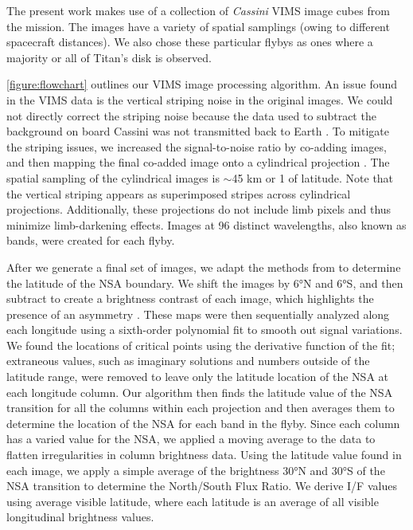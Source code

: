 \documentclass[apj,tighten]{emulateapj}
\begin{document}
The present work makes use of a collection of \textit{Cassini} VIMS image cubes from the mission.
The images have a variety of spatial samplings (owing to different spacecraft distances).
We also chose these particular flybys as ones where a majority or all of Titan's disk is observed. 


\autoref{figure:flowchart} outlines our VIMS image processing algorithm.
An issue found in the VIMS data is the vertical striping noise in the original images.
We could not directly correct the striping noise because the data used to subtract the background on board Cassini was not transmitted back to Earth \citep{brown2004cassini}.
To mitigate the striping issues, we increased the signal-to-noise ratio by co-adding images, and then mapping the final co-added image onto a cylindrical projection \citep{vixie2012mapping}.
The spatial sampling of the cylindrical images is $\sim$45 km or 1\degree{} of latitude.
Note that the vertical striping appears as superimposed stripes across cylindrical projections.
Additionally, these projections do not include limb pixels and thus minimize limb-darkening effects.
Images at 96 distinct wavelengths, also known as bands, were created for each flyby. 


After we generate a final set of images, we adapt the methods from \cite{Roman2009} to determine the latitude of the NSA boundary.
We shift the images by 6°N and 6°S, and then subtract to create a brightness contrast of each image, which highlights the presence of an asymmetry \citep{Roman2009}.
These maps were then sequentially analyzed along each longitude using a sixth-order polynomial fit to smooth out signal variations.
We found the locations of critical points using the derivative function of the fit; extraneous values, such as imaginary solutions and numbers outside of the latitude range, were removed to leave only the latitude location of the NSA at each longitude column.
Our algorithm then finds the latitude value of the NSA transition for all the columns within each projection and then averages them to determine the location of the NSA for each band in the flyby.
Since each column has a varied value for the NSA, we applied a moving average to the data to flatten irregularities in column brightness data.
Using the latitude value found in each image, we apply a simple average of the brightness 30°N and 30°S of the NSA transition to determine the North/South Flux Ratio.
We derive I/F values using average visible latitude, where each latitude is an average of all visible longitudinal brightness values. 
\end{document}
